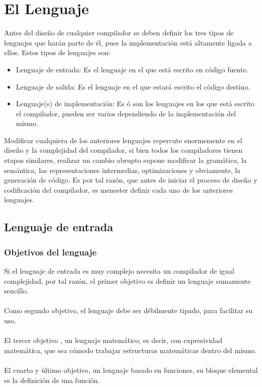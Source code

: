 
\chapter{El Lenguaje}


Antes del diseño de cualquier compilador se deben definir los tres tipos de lenguajes que harán parte de él, pues la implementación está altamente ligada a ellos. Estos tipos de lenguajes son:

\begin{itemize}
	\item Lenguaje de entrada: Es el lenguaje en el que está escrito en código fuente.
	\item Lenguaje de salida: Es el lenguaje en el que estará escrito el código destino.
	\item Lenguaje(s) de implementación: Es ó son los lenguajes en los que está escrito el compilador, pueden ser varios dependiendo de la implementación del mismo.
\end{itemize}

Modificar cualquiera de los anteriores lenguajes repercute enormemente en el diseño y la complejidad del compilador, si bien todos los compiladores tienen etapas similares, realizar un cambio abrupto supone modificar la gramática, la semántica, las representaciones intermedias, optimizaciones y obviamente, la generación de código.
Es por tal razón, que antes de iniciar el proceso de diseño y codificación del compilador, es menester definir cada uno de los anteriores lenguajes.

\section{Lenguaje de entrada}
	\subsection{Objetivos del lenguaje}
	
	Si el lenguaje de entrada es muy complejo necesita un compilador de igual complejidad, por tal razón, el primer objetivo es definir un lenguaje sumamente sencillo.\\\\
	\noindent
	Como segundo objetivo, el lenguaje debe ser débilmente tipado, para facilitar su uso.\\\\
	\noindent
	El tercer objetivo , un lenguaje matemático, es decir, con expresividad matemática, que sea cómodo trabajar estructuras matemáticas dentro del mismo.\\\\
	\noindent
	El cuarto y último objetivo, un lenguaje basado en funciones, su bloque elemental es la definición de una función.
	
